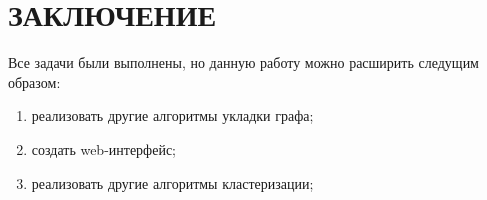 \section*{ЗАКЛЮЧЕНИЕ}
Все задачи были выполнены, но данную работу можно расширить
следущим образом:
\begin{enumerate}
    \item реализовать другие алгоритмы укладки графа;
    \item создать web-интерфейс;
    \item реализовать другие алгоритмы кластеризации;
\end{enumerate}

